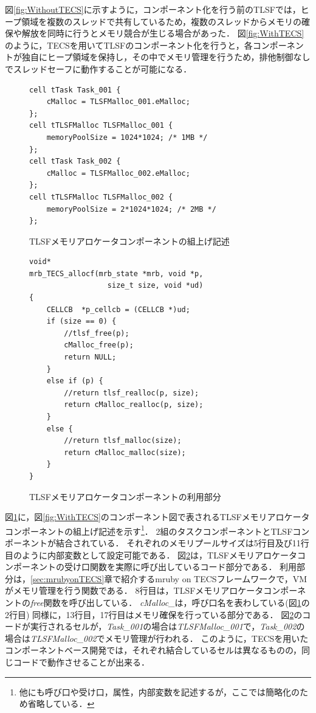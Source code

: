 \documentclass[submit,techrep]{ipsj_v2/UTF8/ipsj}
\begin{document}
図\ref{fig:WithoutTECS}に示すように，コンポーネント化を行う前のTLSFでは，ヒープ領域を複数のスレッドで共有しているため，複数のスレッドからメモリの確保や解放を同時に行うとメモリ競合が生じる場合があった．
図\ref{fig:WithTECS}のように，TECSを用いてTLSFのコンポーネント化を行うと，各コンポーネントが独自にヒープ領域を保持し，その中でメモリ管理を行うため，排他制御なしでスレッドセーフに動作することが可能になる．

\begin{figure}[t]
\centering
\begin{lstlisting}
cell tTask Task_001 {
    cMalloc = TLSFMalloc_001.eMalloc;
};
cell tTLSFMalloc TLSFMalloc_001 {
    memoryPoolSize = 1024*1024; /* 1MB */
};
cell tTask Task_002 {
    cMalloc = TLSFMalloc_002.eMalloc;
};
cell tTLSFMalloc TLSFMalloc_002 {
    memoryPoolSize = 2*1024*1024; /* 2MB */
};
\end{lstlisting}
\caption{TLSFメモリアロケータコンポーネントの組上げ記述}  
\label{src:TLSFBuild}
\end{figure}


\begin{figure}[t]
\centering
\begin{lstlisting}
void*
mrb_TECS_allocf(mrb_state *mrb, void *p, 
                  size_t size, void *ud)
{
    CELLCB	*p_cellcb = (CELLCB *)ud;
    if (size == 0) {
        //tlsf_free(p);
        cMalloc_free(p);
        return NULL;
    }
    else if (p) {
        //return tlsf_realloc(p, size);
        return cMalloc_realloc(p, size);
    }
    else {
        //return tlsf_malloc(size);
        return cMalloc_malloc(size);
    }
}
\end{lstlisting}
\caption{TLSFメモリアロケータコンポーネントの利用部分}  
\label{src:TLSFC}
\end{figure}

図\ref{src:TLSFBuild}に，図\ref{fig:WithTECS}のコンポーネント図で表されるTLSFメモリアロケータコンポーネントの組上げ記述を示す\footnote{他にも呼び口や受け口，属性，内部変数を記述するが，ここでは簡略化のため省略している．}．
2組のタスクコンポーネントとTLSFコンポーネントが結合されている．
それぞれのメモリプールサイズは5行目及び11行目のように内部変数として設定可能である．
図\ref{src:TLSFC}は，TLSFメモリアロケータコンポーネントの受け口関数を実際に呼び出しているコード部分である．
利用部分は，\ref{sec:mrubyonTECS}章で紹介するmruby on TECSフレームワーク\cite{par:mrubyonTECS}で，VMがメモリ管理を行う関数である．
8行目は，TLSFメモリアロケータコンポーネントの{\it free}関数を呼び出している．
{\it cMalloc\_}は，呼び口名を表わしている(図\ref{src:TLSFBuild}の2行目)
同様に，13行目，17行目はメモリ確保を行っている部分である．
図\ref{src:TLSFC}のコードが実行されるセルが，{\it Task\_001}の場合は{\it TLSFMalloc\_001}で，{\it Task\_002}の場合は{\it TLSFMalloc\_002}でメモリ管理が行われる．
このように，TECSを用いたコンポーネントベース開発では，それぞれ結合しているセルは異なるものの，同じコードで動作させることが出来る．
\end{document}
